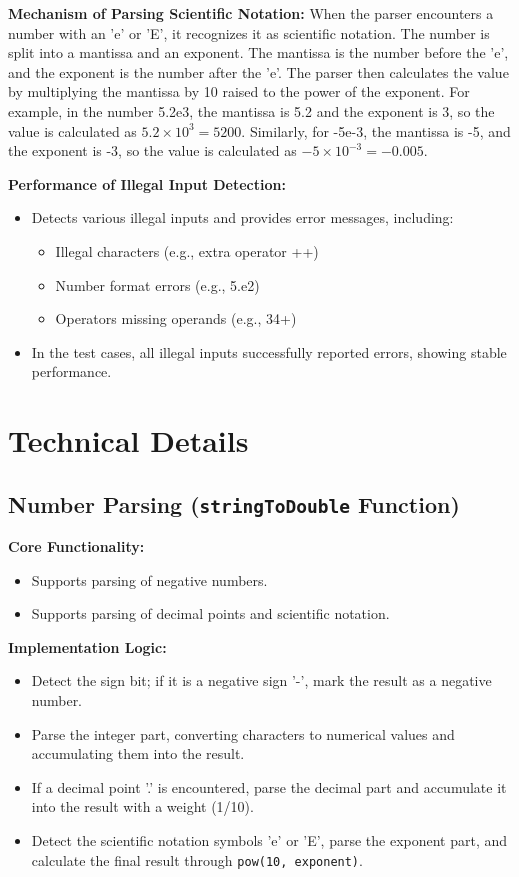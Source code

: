 \documentclass{article}
\begin{document}
\textbf{Mechanism of Parsing Scientific Notation:}
When the parser encounters a number with an 'e' or 'E', it recognizes it as scientific notation. The number is split into a mantissa and an exponent. The mantissa is the number before the 'e', and the exponent is the number after the 'e'. The parser then calculates the value by multiplying the mantissa by 10 raised to the power of the exponent. For example, in the number 5.2e3, the mantissa is 5.2 and the exponent is 3, so the value is calculated as \(5.2 \times 10^3 = 5200\). Similarly, for -5e-3, the mantissa is -5, and the exponent is -3, so the value is calculated as \(-5 \times 10^{-3} = -0.005\).

\textbf{Performance of Illegal Input Detection:}
\begin{itemize}
    \item Detects various illegal inputs and provides error messages, including:
    \begin{itemize}
        \item Illegal characters (e.g., extra operator ++)
        \item Number format errors (e.g., 5.e2)
        \item Operators missing operands (e.g., 34+)
    \end{itemize}
    \item In the test cases, all illegal inputs successfully reported errors, showing stable performance.
\end{itemize}

\section{Technical Details}

\subsection{Number Parsing (\texttt{stringToDouble} Function)}

\textbf{Core Functionality:}
\begin{itemize}
    \item Supports parsing of negative numbers.
    \item Supports parsing of decimal points and
    scientific notation.
\end{itemize}

\textbf{Implementation Logic:}
\begin{itemize}
\item Detect the sign bit; if it is a negative sign '-', mark the result as a negative number.
\item Parse the integer part, converting characters to numerical values and accumulating them into the result.
\item If a decimal point '.' is encountered, parse the decimal part and accumulate it into the result with a weight (1/10).
\item Detect the scientific notation symbols 'e' or 'E', parse the exponent part, and calculate the final result through \texttt{pow(10, exponent)}.
\end{itemize}
\end{document}
